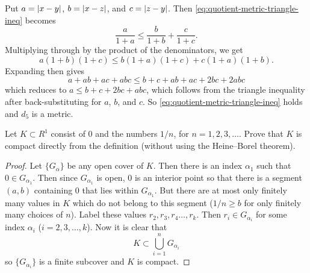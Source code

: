 \begin{solution}
\begin{enumerate}
\begin{equation}
    \end{equation}
    Put $a = \lvert{x - y}\rvert$, $b = \lvert{x - z}\rvert$, and $c = \lvert{z -
      y}\rvert$. Then \eqref{eq:quotient-metric-triangle-ineq} becomes
    \begin{equation*}
      \frac{a}{1 + a} \leq \frac{b}{1 + b} + \frac{c}{1 + c}.
    \end{equation*}
    Multiplying through by the product of the denominators, we get
    \begin{equation*}
      a(1 + b)(1 + c) \leq b(1 + a)(1 + c) + c(1 + a)(1 + b).
    \end{equation*}
    Expanding then gives
    \begin{equation*}
      a + ab + ac + abc \leq b + c + ab + ac + 2bc + 2abc
    \end{equation*}
    which reduces to $a \leq b + c + 2bc + abc$, which follows from
    the triangle inequality after back-substituting for $a$, $b$, and
    $c$. So \eqref{eq:quotient-metric-triangle-ineq} holds and $d_5$
    is a metric. \qedhere
  \end{enumerate}
\end{solution}

 Let $K\subset R^1$ consist of $0$ and the numbers $1/n$,
for $n = 1,2,3,\dots$. Prove that $K$ is compact directly from the
definition (without using the Heine--Borel theorem).
\begin{proof}
  Let $\{G_\alpha\}$ be any open cover of $K$. Then there is an index
  $\alpha_1$ such that $0\in G_{\alpha_1}$. Then since $G_{\alpha_1}$
  is open, $0$ is an interior point so that there is a segment $(a,b)$
  containing $0$ that lies within $G_{\alpha_1}$. But there are at
  most only finitely many values in $K$ which do not belong to this
  segment ($1/n\geq b$ for only finitely many choices of $n$). Label
  these values $r_2,r_3,r_4\dots, r_k$. Then $r_i\in G_{\alpha_i}$ for
  some index $\alpha_i$ ($i=2,3,\dots,k$). Now it is clear that
  \begin{equation*}
    K\subset\bigcup_{i=1}^n G_{\alpha_i}
  \end{equation*}
  so $\{G_{\alpha_i}\}$ is a finite subcover and $K$ is compact.
\end{proof}

